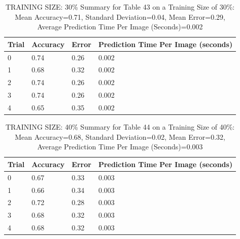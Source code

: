 \documentclass{article}
\begin{document}
\begin{table}[H]

\centering
{\begin{tabular}{||p{1cm}|p{1.8cm}|p{1.8cm}|p{3cm}||}
 \hline
Trial & Accuracy & Error & Prediction Time Per Image (seconds) \\ [0.5ex] 
 \hline\hline
    0  & 0.74  & 0.26  & 0.002\\
\hline
    1  & 0.68  & 0.32  & 0.002\\
\hline
    2  & 0.74  & 0.26  & 0.002\\
\hline
    3  & 0.74  & 0.26  & 0.002\\
\hline
    4  & 0.65  & 0.35  & 0.002\\
\hline

\end{tabular}}
\caption{TRAINING SIZE: 30\% \newline Summary for Table 43 on a Training Size of 30\%: Mean Accuracy=0.71, Standard Deviation=0.04, Mean Error=0.29, Average Prediction Time Per Image (Seconds)=0.002}
\end{table} 

\begin{table}[H]

\centering
{\begin{tabular}{||p{1cm}|p{1.8cm}|p{1.8cm}|p{3cm}||}
 \hline
Trial & Accuracy & Error & Prediction Time Per Image (seconds) \\ [0.5ex] 
 \hline\hline
    0  & 0.67  & 0.33  & 0.003\\
\hline
    1  & 0.66  & 0.34  & 0.003\\
\hline
    2  & 0.72  & 0.28  & 0.003\\
\hline
    3  & 0.68  & 0.32  & 0.003\\
\hline
    4  & 0.68  & 0.32  & 0.003\\
\hline

\end{tabular}}
\caption{TRAINING SIZE: 40\% \newline Summary for Table 44 on a Training Size of 40\%: Mean Accuracy=0.68, Standard Deviation=0.02, Mean Error=0.32, Average Prediction Time Per Image (Seconds)=0.003}
\end{table} 
\end{document}
